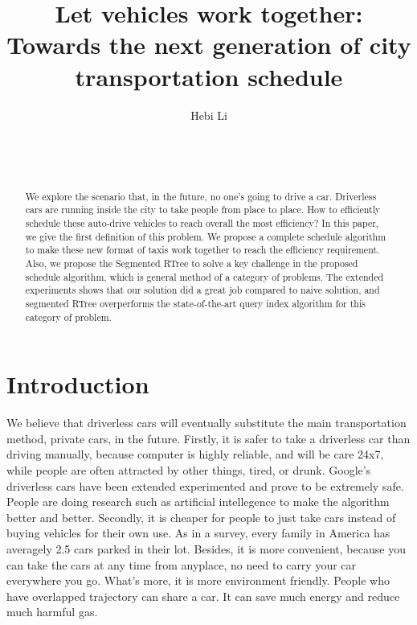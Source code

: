 \documentclass{vldb}
\begin{document}
\title{Let vehicles work together:
Towards the next generation of city transportation schedule}

\author{
\alignauthor
Hebi Li\\
       \\
       \\
       \\
}

\maketitle

\begin{abstract}
We explore the scenario that, in the future, no one’s going to drive a car.
Driverless cars are running inside the city to take people from place to place.
How to efficiently schedule these auto-drive vehicles to reach overall the most efficiency?
In this paper, we give the first definition of this problem.
We propose a complete schedule algorithm to make these new format of taxis work together to reach the efficiency requirement.
Also, we propose the Segmented RTree to solve a key challenge in the proposed schedule algorithm,
which is general method of a category of problems.
The extended experiments shows that our solution did a great job compared to naive solution,
and segmented RTree overperforms the state-of-the-art query index algorithm for this category of problem.
\end{abstract}




\section{Introduction}

We believe that driverless cars will eventually substitute the main transportation method,
private cars, in the future. Firstly, it is safer to take a driverless car than driving manually,
because computer is highly reliable, and will be care 24x7,
while people are often attracted by other things, tired, or drunk.
Google’s driverless cars have been extended experimented and prove to be extremely safe.
People are doing research such as artificial intellegence to make the algorithm better and better.
Secondly, it is cheaper for people to just take cars instead of buying vehicles for their own use.
As in a survey, every family in America has averagely 2.5 cars parked in their lot.
Besides, it is more convenient, because you can take the cars at any time from anyplace,
no need to carry your car everywhere you go. What’s more, it is more environment friendly.
People who have overlapped trajectory can share a car.
It can save much energy and reduce much harmful gas.
\end{document}
